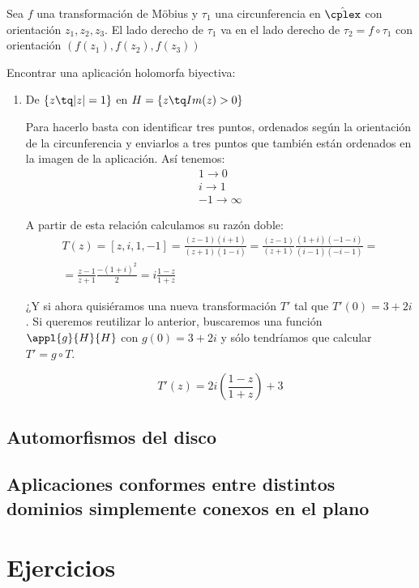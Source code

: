 \documentclass{apuntes}
\begin{document}
\begin{prop}
Sea $f$ una transformación de Möbius y $τ_1$ una circunferencia en $\hat{\cplex}$ con orientación $z_1,z_2,z_3$. El lado derecho de $τ_1$ va en el lado derecho de $τ_2=f \circ τ_1$ con orientación $(f(z_1),f(z_2),f(z_3))$
\end{prop}

\begin{example}
Encontrar una aplicación holomorfa biyectiva:

\begin{enumerate}
\item De $\{z \tq |z|=1\}$ en $H=\{z \tq Im(z)>0\}$

Para hacerlo basta con identificar tres puntos, ordenados según la orientación de la circunferencia y enviarlos a tres puntos que también están ordenados en la imagen de la aplicación. Así tenemos:
\begin{align*}
1 \to 0\\ i \to 1 \\ -1 \to \infty
\end{align*}

A partir de esta relación calculamos su razón doble:
\begin{gather*}
T(z)=[z,i,1,-1]=\frac{(z-1)(i+1)}{(z+1)(1-i)}=\frac{(z-1)}{(z+1)}\frac{(1+i)(-1-i)}{(i-1)(-i-1)}=\\
=\frac{z-1}{z+1}\frac{-(1+i)^2}{2}=i\frac{1-z}{1+z}
\end{gather*}

¿Y si ahora quisiéramos una nueva transformación $T'$ tal que $T'(0)=3+2i$. Si queremos reutilizar lo anterior, buscaremos una función $\appl{g}{H}{H}$ con $g(0)=3+2i$ y sólo tendríamos que calcular $T'=g \circ T$.

\[T'(z)=2i\left( \frac{1-z}{1+z}\right)+3\]

\end{enumerate}
\end{example}

\section{Automorfismos del disco}

\section{Aplicaciones conformes entre distintos dominios simplemente conexos en el plano}





\appendix

\chapter{Ejercicios}

\printindex
\end{document}
